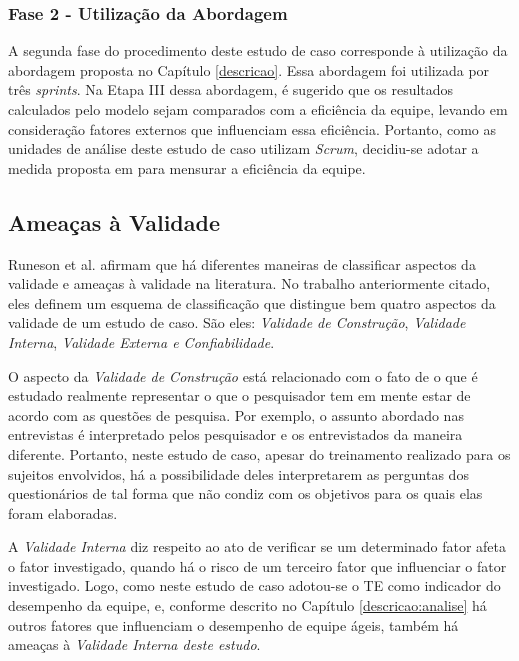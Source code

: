 \subsubsection{Fase 2 - Utilização da Abordagem}
\label{estudodecaso:design:procedimento:abordagem}

A segunda fase do procedimento deste estudo de caso corresponde à utilização da abordagem proposta no Capítulo \ref{descricao}. Essa abordagem foi utilizada por três \textit{sprints}. Na Etapa III dessa abordagem, é sugerido que os resultados calculados pelo modelo sejam comparados com a eficiência da equipe, levando em consideração fatores externos que influenciam essa eficiência. Portanto, como as unidades de análise deste estudo de caso utilizam \textit{Scrum}, decidiu-se adotar a medida proposta em \cite{kumar} para mensurar a eficiência da equipe.

\subsection{Ameaças à Validade}
\label{estudodecaso:design:ameacas}

Runeson et al. \cite{runeson} afirmam que há diferentes maneiras de classificar aspectos da validade e ameaças à validade na literatura. No trabalho anteriormente citado, eles definem um esquema de classificação que distingue bem quatro aspectos da validade de um estudo de caso. São eles: \textit{Validade de Construção}, \textit{Validade Interna}, \textit{Validade Externa e Confiabilidade}.

O aspecto da \textit{Validade de Construção} está relacionado com o fato de o que é estudado realmente representar o que o pesquisador tem em mente estar de acordo com as questões de pesquisa. Por exemplo, o assunto abordado nas entrevistas é interpretado pelos pesquisador e os entrevistados da maneira diferente. Portanto, neste estudo de caso, apesar do treinamento realizado para os sujeitos envolvidos, há a possibilidade deles interpretarem as perguntas dos questionários de tal forma que não condiz com os objetivos para os quais elas foram elaboradas.

A \textit{Validade Interna} diz respeito ao ato de verificar se um determinado fator afeta o fator investigado, quando há o risco de um terceiro fator que influenciar o fator investigado. Logo, como neste estudo de caso adotou-se o TE como indicador do desempenho da equipe, e, conforme descrito no Capítulo \ref{descricao:analise} há outros fatores que influenciam o desempenho de equipe ágeis, também há ameaças à \textit{Validade Interna deste estudo}.


